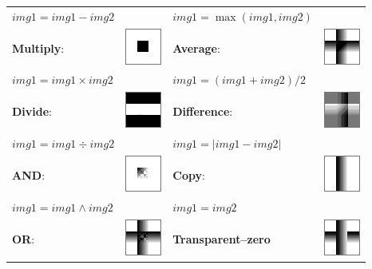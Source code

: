 \begin{table}[h]
\begin{tabular}{llll}
\quad{} $img1=img1-img2$ &  & \quad{} $img1=\max(img1,img2)$ & \tabularnewline\addlinespace
\addlinespace
\textbf{Multiply}: & \multirow{1}{*}{\includegraphics[scale=0.75]{images/ImgCalculator/Multiply}} & \textbf{Average}: & \multirow{1}{*}{\includegraphics[scale=0.75]{images/ImgCalculator/Average}}\tabularnewline
\quad{} $img1=img1\times img2$ &  & \quad{} $img1=(img1+img2)/2$ & \tabularnewline\addlinespace
\addlinespace
\textbf{Divide}: & \multirow{1}{*}{\includegraphics[scale=0.75]{images/ImgCalculator/Divide}} & \textbf{Difference}: & \multirow{1}{*}{\includegraphics[scale=0.75]{images/ImgCalculator/Difference}}\tabularnewline
\quad{} $img1=img1\div img2$ &  & \quad{} $img1=|img1-img2|$ & \tabularnewline\addlinespace
\addlinespace
\index{Logical operations!Images}\index{AND@AND  \see{Logical operations,}}\textbf{AND}: & \multirow{1}{*}{\includegraphics[scale=0.75]{images/ImgCalculator/AND}} & \textbf{Copy}: & \multirow{1}{*}{\includegraphics[scale=0.75]{images/ImgCalculator/Destination}}\tabularnewline
\quad{} $img1=img1\wedge img2$ &  & \quad{} $img1=img2$ & \tabularnewline\addlinespace
\addlinespace
\index{OR@OR  \see{Logical operations,}}\textbf{OR}: & \multirow{1}{*}{\includegraphics[scale=0.75]{images/ImgCalculator/OR}} & \multicolumn{1}{l}{\textbf{Transparent--zero}} & \multirow{1}{*}{\includegraphics[scale=0.75]{images/ImgCalculator/TranspZero}}\tabularnewline

\end{tabular}
\end{table}
